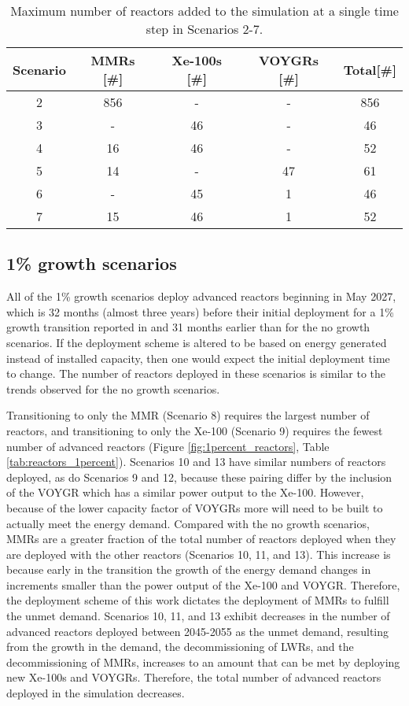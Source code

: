 \begin{table}
    \centering 
    \caption{Maximum number of reactors added to the simulation at a 
    single time step in Scenarios 2-7.}
    \label{tab:reactors_added_nogrowth}
    \begin{tabular}{c c c c c}
        \hline
        Scenario & \glspl{MMR} [\#]& Xe-100s [\#]& VOYGRs [\#]
        & Total[\#]\\\hline
        2 & 856 & - & - & 856\\
        3 & - & 46 & - & 46\\
        4 & 16 & 46 & - & 52\\
        5 & 14 & - & 47 & 61\\
        6 & - & 45 & 1 & 46\\
        7 & 15 & 46 & 1 & 52\\
        \hline
    \end{tabular}
\end{table}

\subsection{1\% growth scenarios} \label{sec:1percent_reactors}
All of the 1\% growth scenarios deploy advanced reactors beginning 
in May 2027, which is 32 months (almost three years) before their initial 
deployment for a 1\% growth 
transition reported in \cite{bachmann_enrichment_2021} and 31 months 
earlier than for the no growth scenarios. If the deployment scheme is 
altered to be based on energy generated instead of installed capacity, 
then one would expect the initial deployment time to change. The number 
of reactors deployed in these scenarios is similar to 
the trends observed for the no 
growth scenarios. 

Transitioning to only the 
\gls{MMR} (Scenario 8) requires the largest number of reactors, and 
transitioning to only the Xe-100 (Scenario 9) requires the fewest 
number of advanced reactors (Figure \ref{fig:1percent_reactors}, Table 
\ref{tab:reactors_1percent}). Scenarios 10 and 13 have similar numbers of 
reactors deployed, as do Scenarios 9 and 12, because these pairing differ 
by the inclusion of the VOYGR which has a similar power output to the 
Xe-100. However, because of the lower capacity factor of VOYGRs more will 
need to be built to actually meet the energy demand. 
Compared with the no growth scenarios, \glspl{MMR} are a greater 
fraction of the total number of reactors deployed when they are deployed 
with the other reactors (Scenarios 10, 11, and 13). This increase is 
because early in the transition the growth of the energy demand 
changes in increments smaller than the power output of the Xe-100 and 
VOYGR. Therefore, the deployment scheme of this work dictates the 
deployment of \glspl{MMR}
to fulfill the unmet demand. Scenarios 10, 11, and 13 exhibit decreases in 
the number of advanced reactors deployed between 2045-2055 as the unmet 
demand, resulting from the growth in the demand, the decommissioning of 
\glspl{LWR}, and the decommissioning of \glspl{MMR}, increases  
to an amount that can be met by deploying new Xe-100s and VOYGRs. Therefore, 
the total number of advanced reactors deployed in the simulation decreases.

